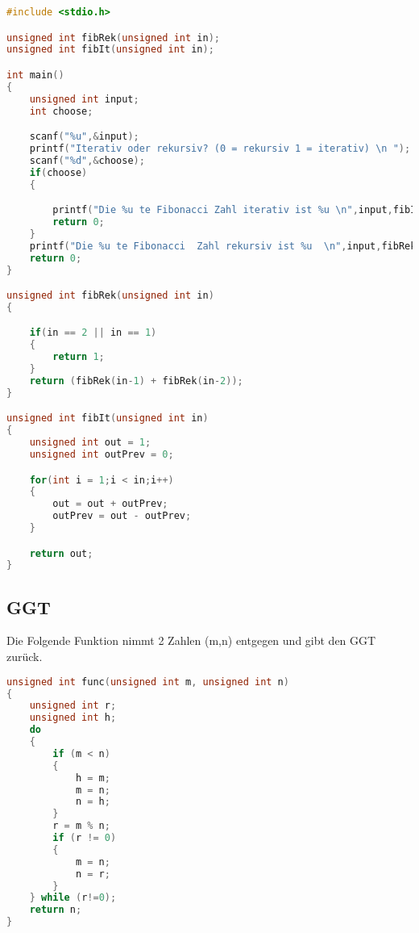 \begin{lstlisting}[language = c]
#include <stdio.h>

unsigned int fibRek(unsigned int in);
unsigned int fibIt(unsigned int in);

int main()
{
    unsigned int input;
    int choose;

    scanf("%u",&input);
    printf("Iterativ oder rekursiv? (0 = rekursiv 1 = iterativ) \n ");
    scanf("%d",&choose);
    if(choose)
    {

        printf("Die %u te Fibonacci Zahl iterativ ist %u \n",input,fibIt(input));
        return 0;
    }
    printf("Die %u te Fibonacci  Zahl rekursiv ist %u  \n",input,fibRek(input));
    return 0;
}

unsigned int fibRek(unsigned int in)
{

    if(in == 2 || in == 1)
    {
        return 1;
    }
    return (fibRek(in-1) + fibRek(in-2));
}

unsigned int fibIt(unsigned int in)
{
    unsigned int out = 1;
    unsigned int outPrev = 0;

    for(int i = 1;i < in;i++)
    {
        out = out + outPrev;
        outPrev = out - outPrev;
    }

    return out;
}

\end{lstlisting}

\vfill\null
\columnbreak	

\subsection{GGT}

Die Folgende Funktion nimmt 2 Zahlen (m,n) entgegen und gibt den GGT zurück.

\begin{lstlisting}[language = c]
unsigned int func(unsigned int m, unsigned int n)
{
    unsigned int r;
    unsigned int h;
    do
    {
        if (m < n)
        {
            h = m;
            m = n;
            n = h;
        }
        r = m % n;
        if (r != 0)
        {
            m = n;
            n = r;
        }
    } while (r!=0);
    return n;
}
\end{lstlisting}
